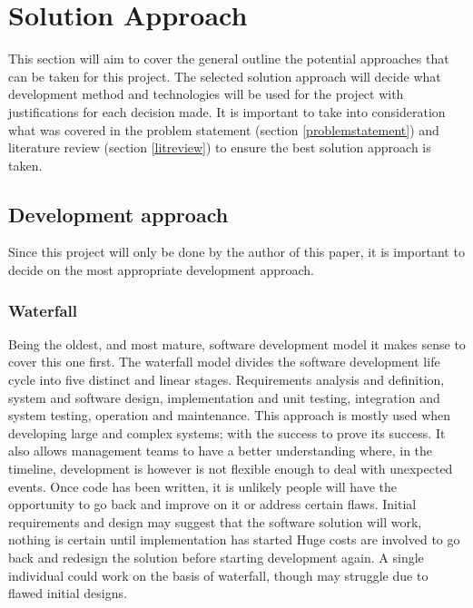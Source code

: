 \section{Solution Approach}
This section will aim to cover the general outline the potential approaches that can be taken for this project.
The selected solution approach will decide what development method and technologies will be used for the project with justifications
for each decision made.
It is important to take into consideration what was covered in the problem statement (section \ref{problemstatement}) and literature
review (section \ref{litreview}) to ensure the best solution approach is taken.

\subsection{Development approach}
Since this project will only be done by the author of this paper, it is important to decide on the most appropriate development approach.

\subsubsection*{Waterfall}
Being the oldest, and most mature, software development model it makes sense to cover this one first.
The waterfall model divides the software development life cycle into five distinct and linear  stages.
Requirements analysis and definition, system and software design, implementation and unit testing, integration and system testing,
operation and maintenance.
This approach is mostly used when developing large and complex systems; with the success to prove its success.
It also allows management teams to have a better understanding where, in the timeline, development is however is not flexible enough
to deal with unexpected events.
Once code has been written, it is unlikely people will have the opportunity to go back and improve on it or address certain flaws.
Initial requirements and design may suggest that the software solution will work, nothing is certain until implementation has started
Huge costs are involved to go back and redesign the solution before starting development again. 
A single individual could work on the basis of waterfall, though may struggle due to flawed initial designs.


